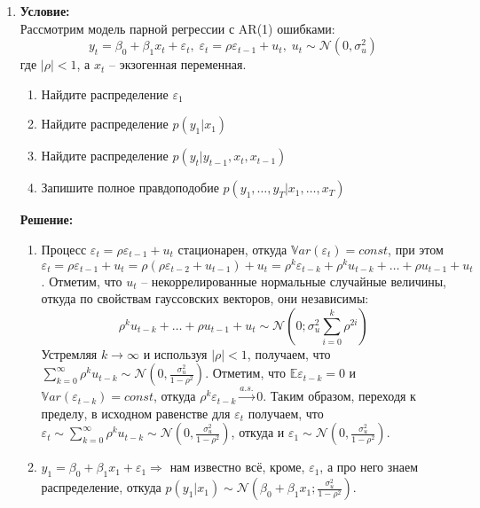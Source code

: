 \documentclass{article}
\begin{document}
\begin{enumerate}
\item \textbf{Условие:}\\
Рассмотрим модель парной регрессии с AR(1) ошибками:
$$y_t = \beta_0 + \beta_1x_t + \varepsilon_t, \; \varepsilon_t = \rho\varepsilon_{t-1} + u_t, \; u_t\sim\mathcal{N}(0, \sigma^2_u)$$
где $|\rho| < 1$, а $x_t$ -- экзогенная переменная.
\begin{enumerate}
    \item Найдите распределение $\varepsilon_1$
    \item Найдите распределение $p(y_1|x_1)$
    \item Найдите распределение $p(y_t|y_{t-1}, x_t, x_{t-1})$
    \item Запишите полное правдоподобие $p(y_1, \hdots, y_T|x_1, \hdots, x_T)$
\end{enumerate}

\textbf{Решение:}

\begin{enumerate}
    \item Процесс $\varepsilon_t = \rho\varepsilon_{t-1} + u_t$ стационарен, откуда $\mathbb{V}ar(\varepsilon_t) = const$, при этом
    $\varepsilon_t = \rho\varepsilon_{t-1} + u_t = \rho(\rho\varepsilon_{t-2} + u_{t-1}) + u_t =
    \rho^k\varepsilon_{t-k} + \rho^k u_{t-k} + \hdots + \rho u_{t-1} + u_t$. Отметим, что $u_t$ -- некоррелированные нормальные случайные величины, откуда
    по свойствам гауссовских векторов, они независимы:
    $$\rho^k u_{t-k} + \hdots + \rho u_{t-1} + u_t \sim \mathcal{N}(0; \sigma^2_u\sum\limits_{i=0}^k \rho^{2i})$$
    Устремляя $k\rightarrow\infty$ и используя $|\rho|<1$, получаем, что $\sum\limits_{k=0}^{\infty}\rho^k u_{t-k} \sim\mathcal{N}(0, \frac{\sigma_u^2}{1 - \rho^2})$.
    Отметим, что $\mathbb{E}\varepsilon_{t-k} = 0$ и $\mathbb{V}ar(\varepsilon_{t-k})=const$, откуда $\rho^k\varepsilon_{t-k}\xrightarrow{a.s.} 0$. Таким образом,
    переходя к пределу, в исходном равенстве для $\varepsilon_{t}$ получаем, что $\varepsilon_{t}\sim\sum\limits_{k=0}^{\infty}\rho^k u_{t-k}
    \sim\mathcal{N}(0, \frac{\sigma_u^2}{1 - \rho^2})$, откуда и $\varepsilon_1\sim\mathcal{N}(0, \frac{\sigma_u^2}{1 - \rho^2})$.

    \item $y_1 = \beta_0 + \beta_1x_1 + \varepsilon_1 \Rightarrow$ нам известно всё, кроме, $\varepsilon_1$, а про него знаем распределение, откуда
    $p(y_1 | x_1) \sim \mathcal{N}(\beta_0 + \beta_1x_1; \frac{\sigma_u^2}{1 - \rho^2})$.


\end{enumerate}
\end{enumerate}
\end{document}
